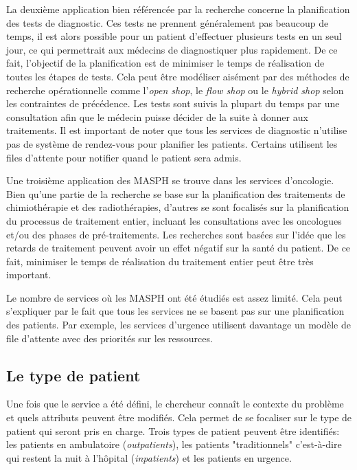 \documentclass[noposter]{polytech/polytech}
\begin{document}
La deuxième application bien référencée par la recherche concerne la planification des tests de diagnostic. Ces tests ne prennent généralement pas beaucoup de temps, il est alors possible pour un patient d'effectuer plusieurs tests en un seul jour, ce qui permettrait aux médecins de diagnostiquer plus rapidement. De ce fait, l'objectif de la planification est de minimiser le temps de réalisation de toutes les étapes de tests. Cela peut être modéliser aisément par des méthodes de recherche opérationnelle comme l'\textit{open shop}, le \textit{flow shop} ou le \textit{hybrid shop} selon les contraintes de précédence. Les tests sont suivis la plupart du temps par une consultation afin que le médecin puisse décider de la suite à donner aux traitements. Il est important de noter que tous les services de diagnostic n'utilise pas de système de rendez-vous pour planifier les patients. Certains utilisent les files d'attente pour notifier quand le patient sera admis. 

Une troisième application des MASPH se trouve dans les services d'oncologie. Bien qu'une partie de la recherche se base sur la planification des traitements de chimiothérapie et des radiothérapies, d'autres se sont focalisés sur la planification du processus de traitement entier, incluant les consultations avec les oncologues et/ou des phases de pré-traitements. Les recherches sont basées sur l'idée que les retards de traitement peuvent avoir un effet négatif sur la santé du patient. De ce fait, minimiser le temps de réalisation du traitement entier peut être très important. 

Le nombre de services où les MASPH ont été étudiés est assez limité. Cela peut s'expliquer par le fait que tous les services ne se basent pas sur une planification des patients. Par exemple, les services d'urgence utilisent davantage un modèle de file d'attente avec des priorités sur les ressources. 

\subsection{Le type de patient}

Une fois que le service a été défini, le chercheur connaît le contexte du problème et quels attributs peuvent être modifiés. Cela permet de se focaliser sur le type de patient qui seront pris en charge. Trois types de patient peuvent être identifiés: les patients en ambulatoire (\textit{outpatients}), les patients "traditionnels" c'est-à-dire qui restent la nuit à l'hôpital (\textit{inpatients}) et les patients en urgence.
\end{document}
